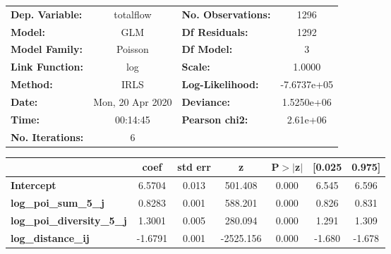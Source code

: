 \begin{center}
\begin{tabular}{lclc}
\toprule
\textbf{Dep. Variable:}            &    totalflow     & \textbf{  No. Observations:  } &      1296    \\
\textbf{Model:}                    &       GLM        & \textbf{  Df Residuals:      } &      1292    \\
\textbf{Model Family:}             &     Poisson      & \textbf{  Df Model:          } &         3    \\
\textbf{Link Function:}            &       log        & \textbf{  Scale:             } &     1.0000   \\
\textbf{Method:}                   &       IRLS       & \textbf{  Log-Likelihood:    } & -7.6737e+05  \\
\textbf{Date:}                     & Mon, 20 Apr 2020 & \textbf{  Deviance:          } &  1.5250e+06  \\
\textbf{Time:}                     &     00:14:45     & \textbf{  Pearson chi2:      } &   2.61e+06   \\
\textbf{No. Iterations:}           &        6         & \textbf{                     } &              \\
\bottomrule
\end{tabular}
\begin{tabular}{lcccccc}
                                   & \textbf{coef} & \textbf{std err} & \textbf{z} & \textbf{P$> |$z$|$} & \textbf{[0.025} & \textbf{0.975]}  \\
\midrule
\textbf{Intercept}                 &       6.5704  &        0.013     &   501.408  &         0.000        &        6.545    &        6.596     \\
\textbf{log\_poi\_sum\_5\_j}       &       0.8283  &        0.001     &   588.201  &         0.000        &        0.826    &        0.831     \\
\textbf{log\_poi\_diversity\_5\_j} &       1.3001  &        0.005     &   280.094  &         0.000        &        1.291    &        1.309     \\
\textbf{log\_distance\_ij}         &      -1.6791  &        0.001     & -2525.156  &         0.000        &       -1.680    &       -1.678     \\
\bottomrule
\end{tabular}
\end{center}